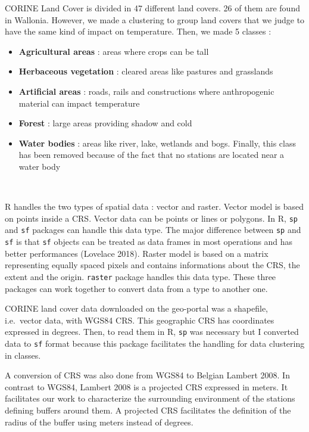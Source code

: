 \documentclass[12pt,twoside]{reedthesis}
\theoremstyle{definition}
\theoremstyle{definition}
\theoremstyle{definition}
\theoremstyle{remark}
\begin{document}
CORINE Land Cover is divided in 47 different land covers. 26 of them are
found in Wallonia. However, we made a clustering to group land covers
that we judge to have the same kind of impact on temperature. Then, we
made 5 classes :
\begin{itemize}
\item
  \textbf{Agricultural areas} : areas where crops can be tall
\item
  \textbf{Herbaceous vegetation} : cleared areas like pastures and
  grasslands
\item
  \textbf{Artificial areas} : roads, rails and constructions where
  anthropogenic material can impact temperature
\item
  \textbf{Forest} : large areas providing shadow and cold
\item
  \textbf{Water bodies} : areas like river, lake, wetlands and bogs.
  Finally, this class has been removed because of the fact that no
  stations are located near a water body
\end{itemize}
~

R handles the two types of spatial data : vector and raster. Vector
model is based on points inside a CRS. Vector data can be points or
lines or polygons. In R, \texttt{sp} and \texttt{sf} packages can handle
this data type. The major difference between \texttt{sp} and \texttt{sf}
is that \texttt{sf} objects can be treated as data frames in most
operations and has better performances (Lovelace 2018). Raster model is
based on a matrix representing equally spaced pixels and contains
informations about the CRS, the extent and the origin. \texttt{raster}
package handles this data type. These three packages can work together
to convert data from a type to another one.

CORINE land cover data downloaded on the geo-portal was a shapefile,
i.e.~vector data, with WGS84 CRS. This geographic CRS has coordinates
expressed in degrees. Then, to read them in R, \texttt{sp} was necessary
but I converted data to \texttt{sf} format because this package
facilitates the handling for data clustering in classes.

A conversion of CRS was also done from WGS84 to Belgian Lambert 2008. In
contrast to WGS84, Lambert 2008 is a projected CRS expressed in meters.
It facilitates our work to characterize the surrounding environment of
the stations defining buffers around them. A projected CRS facilitates
the definition of the radius of the buffer using meters instead of
degrees.

~
\end{document}
